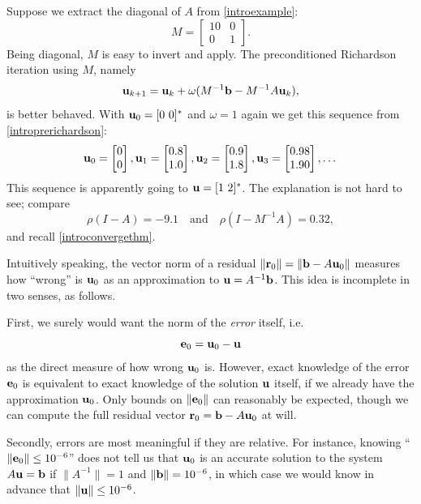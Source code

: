 \medskip\noindent\hrulefill
\begin{examplecont} \label{example:ls:jacobirichardson}  Suppose we extract the diagonal of $A$ from  \eqref{introexample}:
\begin{equation}
M = \begin{bmatrix}
10 & 0 \\ 0 & 1
\end{bmatrix}.  \label{introM}
\end{equation}
Being diagonal, $M$ is easy to invert and apply.  The preconditioned Richardson iteration using $M$, namely
\begin{equation}
\mathbf{u}_{k+1} = \mathbf{u}_k + \omega (M^{-1} \mathbf{b} - M^{-1} A \mathbf{u}_k),  \label{introprerichardson}
\end{equation}
is better behaved.  With $\mathbf{u}_0 = [0\,\, 0]^*$ and $\omega=1$ again we get this sequence from \eqref{introprerichardson}:
\begin{equation}
{\mathbf{u}}_{0} = \begin{bmatrix} 0 \\ 0 \end{bmatrix}, {\mathbf{u}}_{1} = \begin{bmatrix} 0.8 \\ 1.0 \end{bmatrix}, {\mathbf{u}}_{2} = \begin{bmatrix} 0.9 \\ 1.8 \end{bmatrix}, {\mathbf{u}}_{3} = \begin{bmatrix} 0.98 \\ 1.90 \end{bmatrix}, \dots
\end{equation}
This sequence is apparently going to $\mathbf{u} = [1\,\, 2]^*$.  The explanation is not hard to see; compare
\begin{equation}
\rho(I-A) = -9.1 \quad \text{and} \quad \rho(I-M^{-1} A) = 0.32,
\end{equation}
and recall \eqref{introconvergethm}.
\end{examplecont}
\noindent\hrulefill

\medskip
Intuitively speaking, the vector norm of a residual $\|\mathbf{r}_0\| = \|\mathbf{b} - A \mathbf{u}_0\|$ measures how ``wrong'' is $\mathbf{u}_0$ as an approximation to $\mathbf{u}=A^{-1}\mathbf{b}$.  This idea is incomplete in two senses, as follows.

First, we surely would want the norm of the \emph{error} itself, i.e.
\begin{equation}
\mathbf{e}_0 = \mathbf{u}_0 - \mathbf{u} \label{errordefn}
\end{equation}
as the direct measure of how wrong $\mathbf{u}_0$ is.  However, exact knowledge of the error $\mathbf{e}_0$ is equivalent to exact knowledge of the solution $\mathbf{u}$ itself, if we already have the approximation $\mathbf{u}_0$.  Only bounds on $\|\mathbf{e}_0\|$ can reasonably be expected, though we can compute the full residual vector $\mathbf{r}_0 = \mathbf{b} - A \mathbf{u}_0$ at will.

Secondly, errors are most meaningful if they are relative.  For instance, knowing ``$\|\mathbf{e}_0\|\le 10^{-6}$'' does not tell us that $\mathbf{u}_0$ is an accurate solution to the system $A \mathbf{u} = \mathbf{b}$ if $\|A^{-1}\|=1$ and $\|\mathbf{b}\|= 10^{-6}$, in which case we would know in advance that $\|\mathbf{u}\|\le 10^{-6}$.

